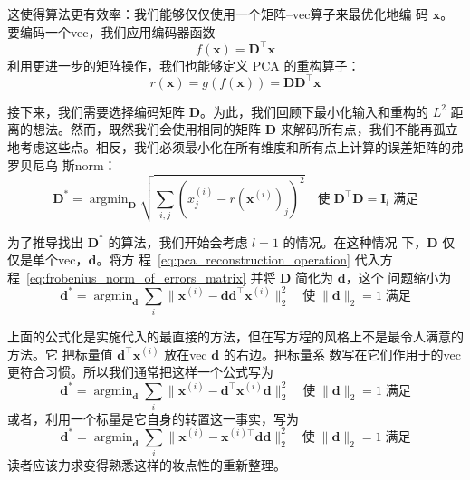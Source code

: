 这使得算法更有效率：我们能够仅仅使用一个矩阵--\gls*{vec}算子来最优化地编
码 $\pmb{x}$。要编码一个\gls*{vec}，我们应用编码器函数
\begin{equation}
  f(\pmb{x}) = \pmb{D}^{\top}\pmb{x}
\end{equation}
利用更进一步的矩阵操作，我们也能够定义 PCA 的重构算子：
\begin{equation}
  r(\pmb{x}) = g(f(\pmb{x})) = \pmb{D}\pmb{D}^{\top}\pmb{x}
  \label{eq:pca_reconstruction_operation}
\end{equation}

接下来，我们需要选择编码矩阵 $\pmb{D}$。为此，我们回顾下最小化输入和重构的 $L^2$
距离的想法。然而，既然我们会使用相同的矩阵 $\pmb{D}$ 来解码所有点，我们不能再孤立
地考虑这些点。相反，我们必须最小化在所有维度和所有点上计算的误差矩阵的弗罗贝尼乌
斯\gls*{norm}：
\begin{equation}
  \pmb{D}^* = \mathop{\arg\min}_{\pmb{D}}\sqrt{\sum_{i,j}(x^{(i)}_j -
    r(\pmb{x}^{(i)})_j)^2}\quad\text{使}\;\pmb{D}^{\top}\pmb{D} =
  \pmb{I}_l\;\text{满足}
  \label{eq:frobenius_norm_of_errors_matrix}
\end{equation}

为了推导找出 $\pmb{D}^*$ 的算法，我们开始会考虑 $l = 1$ 的情况。在这种情况
下，$\pmb{D}$ 仅仅是单个\gls*{vec}，$\pmb{d}$。将方
程~\ref{eq:pca_reconstruction_operation} 代入方
程~\ref{eq:frobenius_norm_of_errors_matrix} 并将 $\pmb{D}$ 简化为 $\pmb{d}$，这个
问题缩小为
\begin{equation}
  \pmb{d}^* = \mathop{\arg\min}_{\pmb{d}}\sum_i\|\pmb{x}^{(i)} -
  \pmb{d}\pmb{d}^{\top}\pmb{x}^{(i)}\|^2_2\quad\text{使}\;\|\pmb{d}\|_2 =
  1\;\text{满足}
\end{equation}

上面的公式化是实施代入的最直接的方法，但在写方程的风格上不是最令人满意的方法。它
把标量值 $\pmb{d}^{\top}\pmb{x}^{(i)}$ 放在\gls*{vec} $\pmb{d}$ 的右边。把标量系
数写在它们作用于的\gls*{vec}更符合习惯。所以我们通常把这样一个公式写为
\begin{equation}
  \pmb{d}^* = \mathop{\arg\min}_{\pmb{d}}\sum_i\|\pmb{x}^{(i)} -
  \pmb{d}^{\top}\pmb{x}^{(i)}\pmb{d}\|^2_2\quad\text{使}\;\|\pmb{d}\|_2 =
  1\;\text{满足}
\end{equation}
或者，利用一个标量是它自身的转置这一事实，写为
\begin{equation}
  \pmb{d}^* = \mathop{\arg\min}_{\pmb{d}}\sum_i\|\pmb{x}^{(i)} -
  \pmb{x}^{(i)\top}\pmb{d}\pmb{d}\|^2_2\quad\text{使}\;\|\pmb{d}\|_2 =
  1\;\text{满足}
\end{equation}
读者应该力求变得熟悉这样的妆点性的重新整理。

